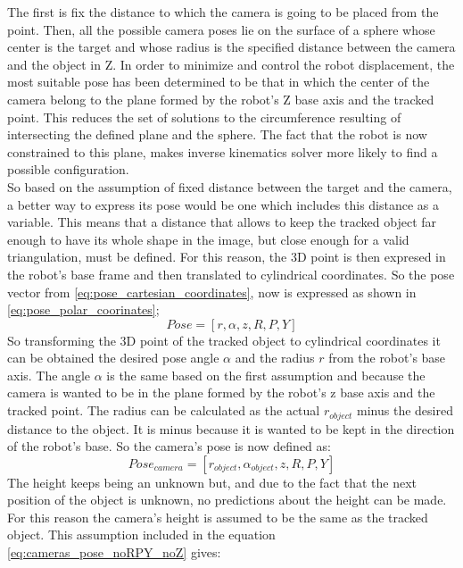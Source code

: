 	The first is fix the distance to which the camera is going to be placed from the point. Then, all the possible camera poses lie on the surface of a sphere whose center is the target and whose radius is the specified distance between the camera and the object in Z.
	In order to minimize and control the robot displacement, the most suitable pose has been determined to be that in which the center of the camera belong to the plane formed by the robot's Z base axis and the tracked point. 
	This reduces the set of solutions to the circumference resulting of intersecting the defined plane and the sphere.
	The fact that the robot is now constrained to this plane, makes inverse kinematics solver more likely to find a possible configuration.\\

	So based on the assumption of fixed distance between the target and the camera, a better way to express its pose would be one which includes this distance as a variable.  
	This means that a distance that allows to keep the tracked object far enough to have its whole shape in the image, but close enough for a valid triangulation, must be defined.
	For this reason, the 3D point is then expresed in the robot's base frame and then translated to cylindrical coordinates. So the pose vector from \ref{eq:pose_cartesian_coordinates}, now is expressed as shown in \ref{eq:pose_polar_coorinates};
		\begin{equation}
		\label{eq:pose_polar_coorinates}
			Pose = [r,\alpha,z,R,P,Y]
		\end{equation}
	So transforming the 3D point of the tracked object to cylindrical coordinates it can be obtained the desired pose angle $\alpha$ and the radius $r$ from the robot's base axis. 
	The angle $\alpha$ is the same based on the first assumption and because the camera is wanted to be in the plane formed by the robot's z base axis and the tracked point. 
	The radius can be calculated as the actual $r_{object}$ minus the desired distance to the object. It is minus because it is wanted to be kept in the direction of the robot's base. 
	So the camera's pose is now defined as:
		\begin{equation}
		\label{eq:cameras_pose_noRPY_noZ}
			Pose_{camera} = [r_{object},\alpha_{object},z,R,P,Y]
		\end{equation}
	The height keeps being an unknown but, and due to the fact that the next position of the object is unknown, no predictions about the height can be made. 
	For this reason the camera's height is assumed to be the same as the tracked object. This assumption included in the equation \ref{eq:cameras_pose_noRPY_noZ} gives:
